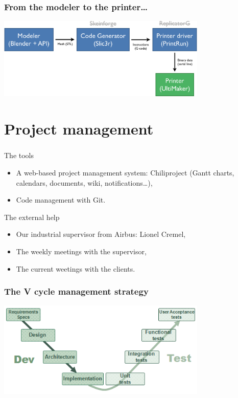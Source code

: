 \documentclass{beamer}
\begin{document}
\begin{frame}
	\frametitle{From the modeler to the printer…}

    \begin{center}
		\includegraphics[width=10cm]{schema}	
	\end{center}
	
\end{frame}

\section{Project management}

\begin{frame}
	\frametitle{}
	\begin{block}{The tools}
    \begin{itemize}
		\item A web-based project management system: Chiliproject (Gantt charts, calendars, documents, wiki, notifications\ldots ),
		\item Code management with Git.
	\end{itemize}
	\end{block}
	
	\begin{block}{The external help}
    \begin{itemize}
		\item Our industrial supervisor from Airbus: Lionel Cremel,
		\item The weekly meetings with the supervisor, 
		\item The current weetings with the clients.
	\end{itemize}
	\end{block}
\end{frame}

\begin{frame}
	\frametitle{The V cycle management strategy}
	\begin{center}
		\includegraphics[width=10cm]{VCycle}	
	\end{center}
    
\end{frame}
\end{document}
